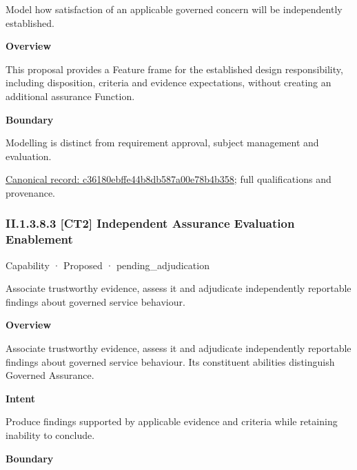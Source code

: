 Model how satisfaction of an applicable governed concern will be independently established.



\textbf{Overview}



This proposal provides a Feature frame for the established design responsibility, including disposition, criteria and evidence expectations, without creating an additional assurance Function.



\textbf{Boundary}



Modelling is distinct from requirement approval, subject management and evaluation.


{\footnotesize \href{../../../../continuum/strategy/capability/feature/c36180ebffe44b8db587a00e78b4b358.md}{Canonical record: c36180ebffe44b8db587a00e78b4b358}; full qualifications and provenance.}\par
\subsubsection*{II.1.3.8.3 [CT2] Independent Assurance Evaluation Enablement}
\label{navigation:II.1.3.8.3}

\label{element:7fa5112efb724b90a17a03c7c19c516a}
{\small Capability · Proposed · pending\_adjudication}\par

Associate trustworthy evidence, assess it and adjudicate independently reportable findings about governed service behaviour.



\textbf{Overview}



Associate trustworthy evidence, assess it and adjudicate independently reportable findings about governed service behaviour. Its constituent abilities distinguish Governed Assurance.



\textbf{Intent}



Produce findings supported by applicable evidence and criteria while retaining inability to conclude.



\textbf{Boundary}



